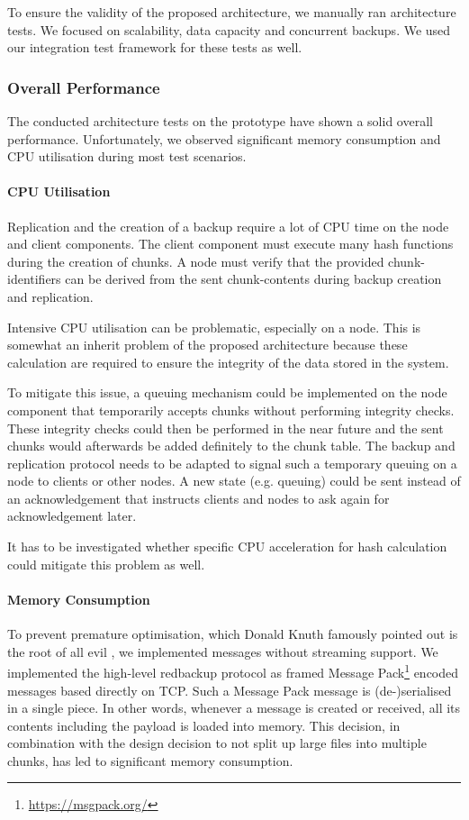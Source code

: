 To ensure the validity of the proposed architecture, we manually ran architecture tests. We focused on scalability, data capacity and concurrent backups. We used our integration test framework for these tests as well.

\subsubsection{Overall Performance}\label{sec:overall-performance}

The conducted architecture tests on the prototype have shown a solid overall performance. Unfortunately, we observed significant memory consumption and CPU utilisation during most test scenarios.

\paragraph{CPU Utilisation}
Replication and the creation of a backup require a lot of CPU time on the \gls{node} and \gls{client} components. The \gls{client} component must execute many hash functions during the creation of \glspl{chunk}. A \gls{node} must verify that the provided \glspl{chunk-identifier} can be derived from the sent \glspl{chunk-content} during backup creation and replication.

Intensive CPU utilisation can be problematic, especially on a \gls{node}. This is somewhat an inherit problem of the proposed architecture because these calculation are required to ensure the integrity of the data stored in the system.

To mitigate this issue, a queuing mechanism could be implemented on the \gls{node} component that temporarily accepts \glspl{chunk} without performing integrity checks. These integrity checks could then be performed in the near future and the sent \glspl{chunk} would afterwards be added definitely to the chunk table. The backup and replication protocol needs to be adapted to signal such a temporary queuing on a \gls{node} to \glspl{client} or other \glspl{node}. A new state (e.g. queuing) could be sent instead of an acknowledgement that instructs \glspl{client} and \glspl{node} to ask again for acknowledgement later.

It has to be investigated whether specific CPU acceleration for hash calculation could mitigate this problem as well.

\paragraph{Memory Consumption}
To prevent premature optimisation, which Donald Knuth famously pointed out is the root of all evil \cite{knuth-optimise}, we implemented \glspl{message} without streaming support. We implemented the high-level redbackup protocol as framed Message Pack\footnote{\url{https://msgpack.org/}} encoded \glspl{message} based directly on TCP. Such a Message Pack \gls{message} is (de-)serialised in a single piece. In other words, whenever a \gls{message} is created or received, all its contents including the payload is loaded into memory. This decision, in combination with the design decision to not split up large files into multiple \glspl{chunk}, has led to significant memory consumption.

